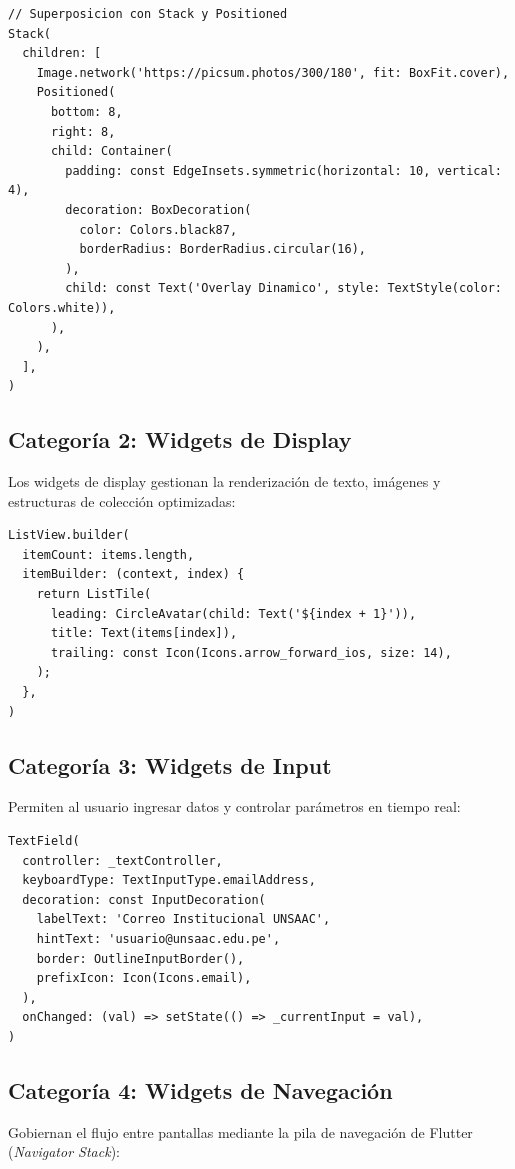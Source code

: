 \documentclass[12pt,a4paper]{article}
\begin{document}
\begin{lstlisting}[caption={Ejemplo representativo de composición de Layout},label={lst:layout}]
// Superposicion con Stack y Positioned
Stack(
  children: [
    Image.network('https://picsum.photos/300/180', fit: BoxFit.cover),
    Positioned(
      bottom: 8,
      right: 8,
      child: Container(
        padding: const EdgeInsets.symmetric(horizontal: 10, vertical: 4),
        decoration: BoxDecoration(
          color: Colors.black87,
          borderRadius: BorderRadius.circular(16),
        ),
        child: const Text('Overlay Dinamico', style: TextStyle(color: Colors.white)),
      ),
    ),
  ],
)
\end{lstlisting}

\subsection{Categoría 2: Widgets de Display}
Los widgets de display gestionan la renderización de texto, imágenes y estructuras de colección optimizadas:

\begin{lstlisting}[caption={Construcción diferida mediante ListView.builder},label={lst:listview}]
ListView.builder(
  itemCount: items.length,
  itemBuilder: (context, index) {
    return ListTile(
      leading: CircleAvatar(child: Text('${index + 1}')),
      title: Text(items[index]),
      trailing: const Icon(Icons.arrow_forward_ios, size: 14),
    );
  },
)
\end{lstlisting}

\subsection{Categoría 3: Widgets de Input}
Permiten al usuario ingresar datos y controlar parámetros en tiempo real:

\begin{lstlisting}[caption={Campo de texto interactivo con decorador y validación},label={lst:textfield}]
TextField(
  controller: _textController,
  keyboardType: TextInputType.emailAddress,
  decoration: const InputDecoration(
    labelText: 'Correo Institucional UNSAAC',
    hintText: 'usuario@unsaac.edu.pe',
    border: OutlineInputBorder(),
    prefixIcon: Icon(Icons.email),
  ),
  onChanged: (val) => setState(() => _currentInput = val),
)
\end{lstlisting}

\subsection{Categoría 4: Widgets de Navegación}
Gobiernan el flujo entre pantallas mediante la pila de navegación de Flutter (\textit{Navigator Stack}):
\end{document}
